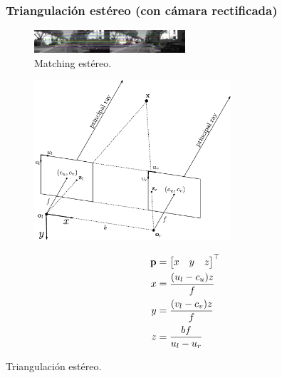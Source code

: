 \begin{frame}
	\frametitle{Triangulación estéreo (con cámara rectificada)}
	\footnotesize
	\begin{figure}
		\includegraphics[width=0.5\textwidth]{./images/stereo_matches.pdf}
		\caption{Matching estéreo.}    
	\end{figure}
	\vspace{-2em}
	\begin{minipage}[t]{0.65\textwidth}
		\begin{figure}
			\includegraphics[width=0.65\textwidth]{./images/stereo_triangulation.pdf}
		\end{figure}
	\end{minipage}
	\begin{minipage}[t]{0.3\textwidth}
		\centering
		\begin{align*}
			\boldsymbol{\mathbf{p}}&=\begin{bmatrix}x & y & z\end{bmatrix}^{\top}\\
			x &= \frac{(u_{l}-c_{u})z}{f}\\
			y &= \frac{(v_{l}-c_{v})z}{f}\\
			z &= \frac{bf}{u_{l}-u_{r}}
		\end{align*}
	\end{minipage}
	\centering
	
	Triangulación estéreo.
\end{frame}

